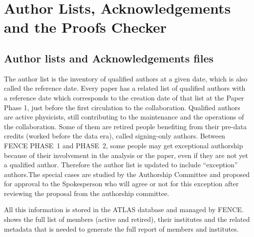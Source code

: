 
\section{Author Lists, Acknowledgements and the Proofs Checker}%
\label{sec:Authorlists_Acknowledgements_and_ProofChecker}
\subsection{Author lists and Acknowledgements files}%
\label{sec:Author_lists_and_acknowledgments_files}


The author list is the inventory of qualified authors at a given date, which is also called the reference date. Every paper has a related list of qualified authors with a reference date which corresponds to the creation date of that list at the Paper Phase 1, just before the first circulation to the collaboration. Qualified authors are active physicists, still contributing to the maintenance and the operations of the collaboration.
Some of them are retired people benefiting from their pre-data credits (worked before the data era), called signing-only authors.
Between FENCE PHASE~1 and PHASE~2, some people may get exceptional authorship because of their involvement in the analysis or the paper,
even if they are not yet a qualified author.
Therefore the author list is updated to include \enquote{exception} authors.The special cases are studied by the Authorship Committee and proposed for approval to the Spokesperson who will agree or not for this exception after reviewing the proposal from the authorship committee.

All this information is stored in the ATLAS database and managed by FENCE\@.
 shows the full list of members (active and retired), their institutes and the related metadata that is needed to generate the full report of members and institutes.

